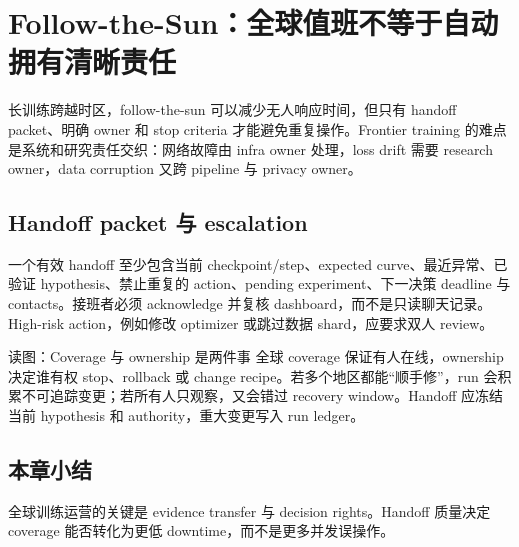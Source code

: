 \section{Follow-the-Sun：全球值班不等于自动拥有清晰责任}

长训练跨越时区，follow-the-sun 可以减少无人响应时间，但只有 handoff packet、明确 owner 和 stop criteria 才能避免重复操作。Frontier training 的难点是系统和研究责任交织：网络故障由 infra owner 处理，loss drift 需要 research owner，data corruption 又跨 pipeline 与 privacy owner。

\subsection{Handoff packet 与 escalation}

一个有效 handoff 至少包含当前 checkpoint/step、expected curve、最近异常、已验证 hypothesis、禁止重复的 action、pending experiment、下一决策 deadline 与 contacts。接班者必须 acknowledge 并复核 dashboard，而不是只读聊天记录。High-risk action，例如修改 optimizer 或跳过数据 shard，应要求双人 review。


\begin{knowledgebox}{读图：Coverage 与 ownership 是两件事}
全球 coverage 保证有人在线，ownership 决定谁有权 stop、rollback 或 change recipe。若多个地区都能“顺手修”，run 会积累不可追踪变更；若所有人只观察，又会错过 recovery window。Handoff 应冻结当前 hypothesis 和 authority，重大变更写入 run ledger。
\end{knowledgebox}


\subsection{本章小结}

全球训练运营的关键是 evidence transfer 与 decision rights。Handoff 质量决定 coverage 能否转化为更低 downtime，而不是更多并发误操作。

